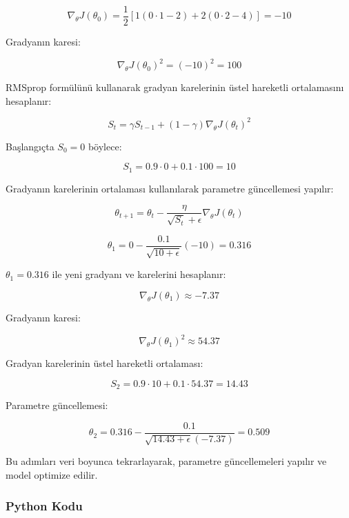 \[ \nabla_\theta J(\theta_0) = \frac{1}{2} [1(0 \cdot 1 - 2) + 2(0 \cdot 2 - 4)] = -10 \]

Gradyanın karesi:

\[ \nabla_\theta J(\theta_0)^2 = (-10)^2 = 100 \]

RMSprop formülünü kullanarak gradyan karelerinin üstel hareketli ortalamasını hesaplanır:

\[ S_t = \gamma S_{t-1} + (1 - \gamma) \nabla_\theta J(\theta_t)^2 \]

Başlangıçta $S_0 = 0$ böylece:

\[ S_1 = 0.9 \cdot 0 + 0.1 \cdot 100 = 10 \]

Gradyanın karelerinin ortalaması kullanılarak parametre güncellemesi yapılır:

\[ \theta_{t+1} = \theta_t - \frac{\eta}{\sqrt{S_t} + \epsilon} \nabla_\theta J(\theta_t) \]

\[ \theta_1 = 0 - \frac{0.1}{\sqrt{10 + \epsilon}} (-10) = 0.316 \]

$\theta_1 = 0.316$ ile yeni gradyanı ve karelerini hesaplanır:

\[ \nabla_\theta J(\theta_1) \approx -7.37 \]

Gradyanın karesi:

\[ \nabla_\theta J(\theta_1)^2 \approx 54.37 \]

Gradyan karelerinin üstel hareketli ortalaması:

\[ S_2 = 0.9 \cdot 10 + 0.1 \cdot 54.37 = 14.43 \]

Parametre güncellemesi:

\[ \theta_2 = 0.316 - \frac{0.1}{\sqrt{14.43 + \epsilon} (-7.37)} = 0.509 \]

Bu adımları veri boyunca tekrarlayarak, parametre güncellemeleri yapılır ve model optimize edilir.

\subsubsection{Python Kodu}

